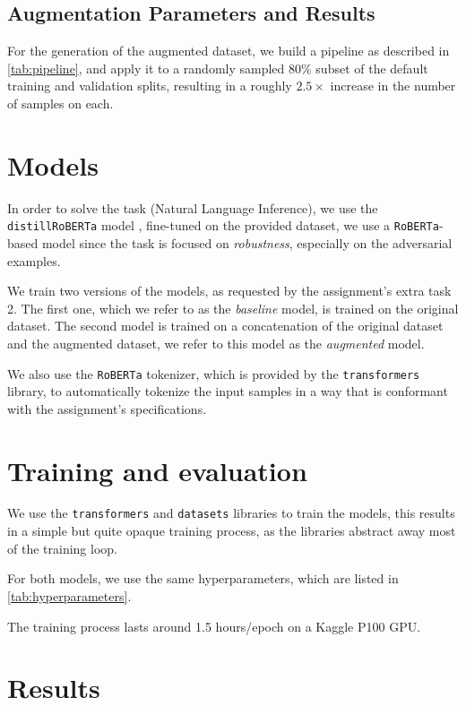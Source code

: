 \documentclass[10pt]{article}
\begin{document}
\subsection{Augmentation Parameters and Results}

For the generation of the augmented dataset, we build a pipeline as described in \cref{tab:pipeline}, and apply it
to a randomly sampled $80\%$ subset of the default training and validation splits, resulting in a roughly $2.5\times$ increase in the number of samples on each.


\section{Models}

In order to solve the task (Natural Language Inference), we use the \texttt{distillRoBERTa} model \cite{distillbert,carbon}, fine-tuned
on the provided dataset, we use a \texttt{RoBERTa}-based model since the task is focused on \emph{robustness}, especially on the adversarial examples.

We train two versions of the models, as requested by the assignment's extra task 2. The first one, which we refer to as the
\textit{baseline} model, is trained on the original dataset. The second model is trained on a concatenation of the original dataset
and the augmented dataset, we refer to this model as the \textit{augmented} model.

We also use the \texttt{RoBERTa} tokenizer, which is provided by the \texttt{transformers} library, to automatically tokenize the input samples
in a way that is conformant with the assignment's specifications.

\section{Training and evaluation}

We use the \texttt{transformers} \cite{transformers} and \texttt{datasets} \cite{datasets} libraries to train the models, this results in a simple
but quite opaque training process, as the libraries abstract away most of the training loop.

For both models, we use the same hyperparameters, which are listed in \cref{tab:hyperparameters}.

The training process lasts around 1.5 hours/epoch on a Kaggle P100 GPU.

\section{Results}
\end{document}
